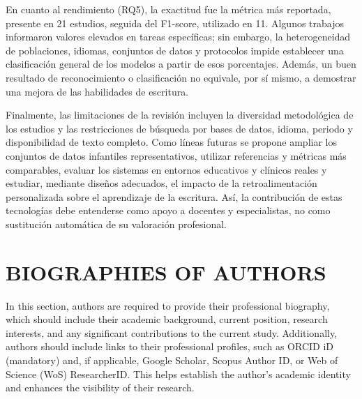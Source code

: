 \documentclass{iaesarticle}
\begin{document}
En cuanto al rendimiento (RQ5), la exactitud fue la métrica más reportada,
presente en 21 estudios, seguida del F1-score, utilizado en 11. Algunos
trabajos informaron valores elevados en tareas específicas; sin embargo, la
heterogeneidad de poblaciones, idiomas, conjuntos de datos y protocolos impide
establecer una clasificación general de los modelos a partir de esos
porcentajes. Además, un buen resultado de reconocimiento o clasificación no
equivale, por sí mismo, a demostrar una mejora de las habilidades de escritura.

Finalmente, las limitaciones de la revisión incluyen la diversidad metodológica
de los estudios y las restricciones de búsqueda por bases de datos, idioma,
periodo y disponibilidad de texto completo. Como líneas futuras se propone
ampliar los conjuntos de datos infantiles representativos, utilizar referencias
y métricas más comparables, evaluar los sistemas en entornos educativos y
clínicos reales y estudiar, mediante diseños adecuados, el impacto de la
retroalimentación personalizada sobre el aprendizaje de la escritura. Así,
la contribución de estas tecnologías debe entenderse como apoyo a docentes y
especialistas, no como sustitución automática de su valoración profesional.



\footnotesize




\section*{BIOGRAPHIES OF AUTHORS}
\normalsize 
In this section, authors are required to provide their professional biography, which should include their academic background, current position, research interests, and any significant contributions to the current study. Additionally, authors should include links to their professional profiles, such as ORCID iD (mandatory) and, if applicable, Google Scholar, Scopus Author ID, or Web of Science (WoS) ResearcherID. This helps establish the author’s academic identity and enhances the visibility of their research.
\end{document}
